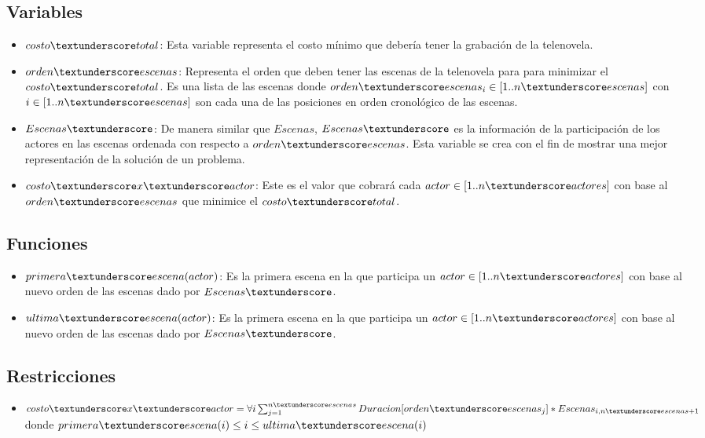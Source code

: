 \documentclass{article}
\begin{document}
\subsection{Variables}
\begin{itemize}
    \item $costo\textunderscore total$: Esta variable representa el costo mínimo que debería tener la grabación de la telenovela.
    \item $orden\textunderscore escenas$: Representa el orden que deben tener las escenas de la telenovela para para minimizar el $costo\textunderscore total$. Es una lista de las escenas donde $orden\textunderscore escenas_i \in [1..n\textunderscore escenas]$ con $i \in [1..n\textunderscore escenas]$ son cada una de las posiciones en orden cronológico de las escenas.
    \item $Escenas\textunderscore$: De manera similar que $Escenas$, $Escenas\textunderscore$ es la información de la participación de los actores en las escenas ordenada con respecto a $orden\textunderscore escenas$. Esta variable se crea con el fin de mostrar una mejor representación de la solución de un problema.
    \item $costo\textunderscore x\textunderscore actor$: Este es el valor que cobrará cada $actor \in [1..n\textunderscore actores]$ con base al $orden\textunderscore escenas$ que minimice el $costo\textunderscore total$.
\end{itemize}

\subsection{Funciones}
\begin{itemize}
    \item $primera\textunderscore escena(actor)$: Es la primera escena en la que participa un $actor \in [1..n\textunderscore actores]$ con base al nuevo orden de las escenas dado por $Escenas\textunderscore$.
    \item $ultima\textunderscore escena(actor)$: Es la primera escena en la que participa un $actor \in [1..n\textunderscore actores]$ con base al nuevo orden de las escenas dado por $Escenas\textunderscore$.
\end{itemize}

\subsection{Restricciones}
\begin{itemize}
    \item $costo\textunderscore x\textunderscore actor = \forall i\sum_{j=1}^{n\textunderscore escenas} Duracion[orden\textunderscore escenas_j] * Escenas_{i,n\textunderscore escenas+1}$\newline
          donde $primera\textunderscore escena(i) \leq i \leq ultima\textunderscore escena(i)$
\end{itemize}
\end{document}
